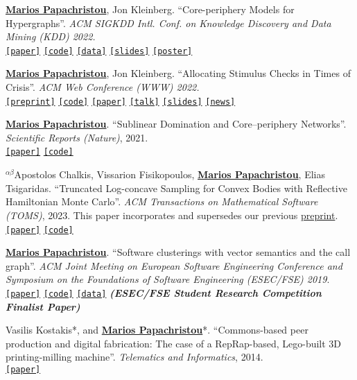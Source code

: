 \documentclass[margin]{res}
\newcommand{\alphabeticalorder}[0]{\ensuremath {^{\alpha \beta}}}
\newcommand{\specialurl}[2]{\href {#2} {\texttt{[#1]}}}
\newcommand{\preprint}[1]{\specialurl {preprint} {#1}}
\newcommand{\code}[1]{\specialurl {code} {#1}}
\newcommand{\data}[1]{\specialurl {data} {#1}}
\newcommand{\talk}[1]{\specialurl {talk} {#1}}
\newcommand{\slides}[1]{\specialurl {slides} {#1}}
\newcommand{\poster}[1]{\specialurl {poster} {#1}}
\newcommand{\paper}[1]{\specialurl {paper} {#1}}
\newcommand{\authorref}[1]{\underline {\textbf{#1}}}
\newcommand{\news}[1]{\specialurl {news} {#1}}
\newcommand{\authorme}{\authorref{Marios Papachristou}}
\begin{document}
\begin{resume}
\begin{enumerate}[nosep, label={[P\arabic*]}]
   \item \authorme, Jon Kleinberg. ``Core-periphery Models for Hypergraphs''. \emph{ACM SIGKDD Intl. Conf. on Knowledge Discovery and Data Mining (KDD) 2022.} \\
   \paper{https://arxiv.org/abs/2206.00783} \code{https://doi.org/10.5281/zenodo.5965849} \data{https://doi.org/10.5281/zenodo.5943043} \slides{https://drive.google.com/file/d/1k9pjPaeDtg7jhUivjlEmyunimcUb-DxL/view?usp=sharing} \poster{https://drive.google.com/file/d/1RJ3C7KKhTemfj5OBAiEXUHMVp-TJhTDs/view?usp=sharing}
   \item  \authorme, Jon Kleinberg. ``Allocating Stimulus Checks in Times of Crisis''. \emph{ACM Web Conference (WWW) 2022.} \\\preprint{https://arxiv.org/abs/2106.07560} \code{https://github.com/papachristoumarios/financial-contagion} \paper{https://doi.org/10.1145/3485447.3512047} \talk{https://youtu.be/WUmPBztK8Mo} \slides{https://drive.google.com/file/d/1v4v4jPOTzFtP8a5dhAFLoIjZSRDxAjBz/view?usp=sharing} \news{https://www.minneapolisfed.org/article/2022/social-policy-in-the-age-of-algorithms-an-interview-with-jon-kleinberg}   
   \item \authorme. ``Sublinear Domination and Core--periphery Networks''. \emph{Scientific Reports (Nature)}, 2021. \\ \paper{http://www.nature.com/articles/s41598-021-94105-8} \code{https://bit.ly/3wKNGI0} 
    \item \alphabeticalorder Apostolos Chalkis, Vissarion Fisikopoulos, \authorme, Elias Tsigaridas. ``Truncated Log-concave Sampling for Convex Bodies with Reflective Hamiltonian Monte Carlo''.   \emph{ACM Transactions on Mathematical Software (TOMS)}, 2023. This paper incorporates and supersedes our previous \href{https://arxiv.org/abs/2102.13068}{preprint}. \\ \paper{https://doi.org/10.1145/3589505} \code{https://github.com/GeomScale/volume_approximation}
    \item \authorme. ``Software clusterings with vector semantics and the call graph''. \emph{ACM Joint Meeting on European Software Engineering Conference and Symposium on the Foundations of Software Engineering (ESEC/FSE) 2019}. \\ \paper{https://dl.acm.org/citation.cfm?id=3342483} \code{https://github.com/papachristoumarios/sade} \data{http://doi.org/10.5281/zenodo.2652487} \textbf{\emph{(ESEC/FSE Student Research Competition Finalist Paper)}}
    \item Vasilis Kostakis*, and \authorme*. ``Commons-based peer production and digital fabrication: The case of a RepRap-based, Lego-built 3D printing-milling machine''. \emph{Telematics and Informatics}, 2014. \\ \paper{https://bit.ly/2JRoisV} 
    

\end{enumerate}
\end{resume}
\end{document}
